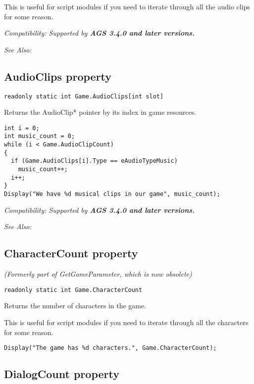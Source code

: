 This is useful for script modules if you need to iterate through all the audio clips for some reason.

\it{Compatibility:} Supported by \bf{AGS 3.4.0} and later versions.

\it{See Also:} 


\subsection{AudioClips property}\label{Game.AudioClips}%

\begin{verbatim}
readonly static int Game.AudioClips[int slot]
\end{verbatim}
Returns the AudioClip* pointer by its index in game resources.

\begin{verbatim}
int i = 0;
int music_count = 0;
while (i < Game.AudioClipCount)
{
  if (Game.AudioClips[i].Type == eAudioTypeMusic)
    music_count++;
  i++;
}
Display("We have %d musical clips in our game", music_count);
\end{verbatim}

\it{Compatibility:} Supported by \bf{AGS 3.4.0} and later versions.

\it{See Also:} 


\subsection{CharacterCount property}\label{Game.CharacterCount}%

\it{(Formerly part of GetGameParameter, which is now obsolete)}

\begin{verbatim}
readonly static int Game.CharacterCount
\end{verbatim}
Returns the number of characters in the game.

This is useful for script modules if you need to iterate through all the characters for some reason.

\begin{verbatim}
Display("The game has %d characters.", Game.CharacterCount);
\end{verbatim}


\subsection{DialogCount property}\label{Game.DialogCount}%

